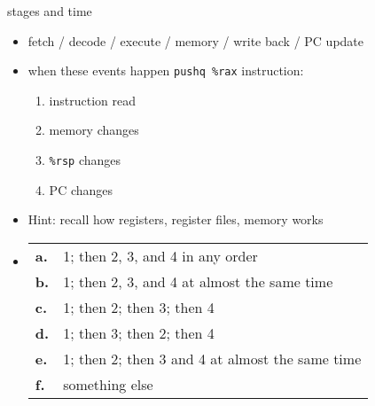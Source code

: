 \begin{frame}[fragile,label=StagesAndTime]{stages and time}
    \begin{itemize}
        \item {\small fetch / decode / execute / memory / write back / PC update}
        \item {} when these events happen \lstinline|pushq %rax| instruction:
            \begin{enumerate}
                \item instruction read
                \item memory changes
                \item \lstinline|%rsp| changes
                \item PC changes
            \end{enumerate}
        \item Hint: recall how registers, register files, memory works
        \vspace{-.1cm}
        \item\begin{tabular}{ll}
            \textbf{a.} & 1; then 2, 3, and 4 in any order \\
            \textbf{b.} & 1; then 2, 3, and 4 at almost the same time \\
            \textbf{c.} & 1; then 2; then 3; then 4 \\
            \textbf{d.} & 1; then 3; then 2; then 4 \\
            \textbf{e.} & 1; then 2; then 3 and 4 at almost the same time \\
            \textbf{f.} & something else \\
        \end{tabular}
    \end{itemize} 
\end{frame}

